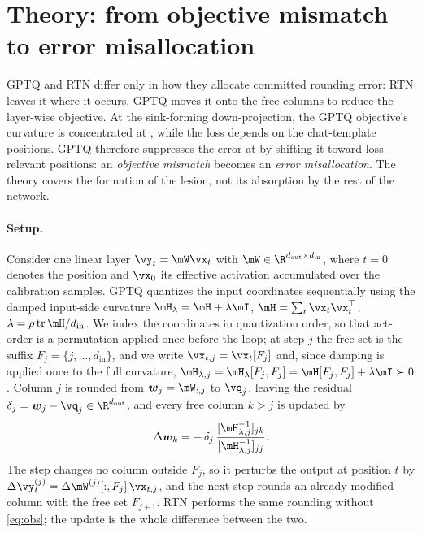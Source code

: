 \section{Theory: from objective mismatch to error misallocation}
\label{sec:mechanism}

GPTQ and RTN differ only in how they allocate committed rounding error: RTN leaves it where it occurs, GPTQ moves it onto the free columns to reduce the layer-wise objective. At the sink-forming down-projection, the GPTQ objective's curvature is concentrated at \bos{}, while the loss depends on the chat-template positions. GPTQ therefore suppresses the error at \bos{} by shifting it toward loss-relevant positions: an \emph{objective mismatch} becomes an \emph{error misallocation}. The theory covers the formation of the lesion, not its absorption by the rest of the network.


\paragraph{Setup.}
Consider one linear layer $\vy_t=\mW\vx_t$ with $\mW\in\R^{d_{\mathrm{out}}\times d_{\mathrm{in}}}$, where $t=0$ denotes the \bos{} position and $\vx_0$ its effective activation accumulated over the calibration samples.
GPTQ quantizes the input coordinates sequentially using the damped input-side curvature $\hess_\lambda=\hess+\lambda\mI$, $\hess=\sum_t\vx_t\vx_t^\top$, $\lambda=\rho\operatorname{tr}\hess/d_{\mathrm{in}}$.
We index the coordinates in quantization order, so that act-order is a permutation applied once before the loop; at step $j$ the free set is the suffix $F_j=\{j,\dots,d_{\mathrm{in}}\}$, and we write $\vx_{t,j}=\vx_t[F_j]$ and, since damping is applied once to the full curvature, $\hess_{\lambda,j}=\hess_\lambda[F_j,F_j]=\hess[F_j,F_j]+\lambda\mI\succ0$.
Column $j$ is rounded from $\vw_j=\mW_{:,j}$ to $\vq_j$, leaving the residual $\delta_j=\vw_j-\vq_j\in\R^{d_{\mathrm{out}}}$, and every free column $k>j$ is updated by
\begin{equation}
\label{eq:obs}
\Delta\vw_k=-\,\delta_j\,\frac{[\hess_{\lambda,j}^{-1}]_{jk}}{[\hess_{\lambda,j}^{-1}]_{jj}} .
\end{equation}
The step changes no column outside $F_j$, so it perturbs the output at position $t$ by $\Delta\vy_t^{(j)}=\Delta\mW^{(j)}[:,F_j]\,\vx_{t,j}$, and the next step rounds an already-modified column with the free set $F_{j+1}$.
RTN performs the same rounding without \cref{eq:obs}; the update is the whole difference between the two.

